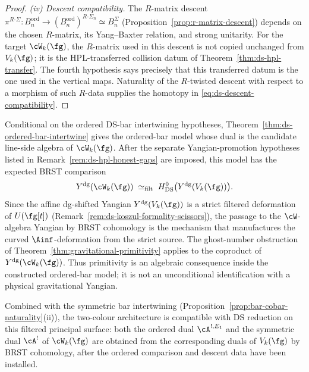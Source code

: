\begin{proof}
\emph{(iv) Descent compatibility.}
The $R$-matrix descent
$\pi^{R\text{-}\Sigma}\colon
B^{\mathrm{ord}}_n \to (B^{\mathrm{ord}}_n)^{R\text{-}\Sigma_n}
\simeq B^\Sigma_n$
(Proposition~\ref{prop:r-matrix-descent}) depends on the
chosen \(R\)-matrix, its Yang--Baxter relation, and strong unitarity.
For the target \(\cW_k(\fg)\), the \(R\)-matrix used in this descent
is not copied unchanged from \(V_k(\fg)\); it is the HPL-transferred
collision datum of Theorem~\ref{thm:ds-hpl-transfer}.  The fourth
hypothesis says precisely that this transferred datum is the one used
in the vertical maps.  Naturality of the \(R\)-twisted descent with
respect to a morphism of such \(R\)-data supplies the homotopy in
\eqref{eq:ds-descent-compatibility}.
\end{proof}

\begin{remark}
\label{rem:ds-ordered-bar-yangian}
%
Conditional on the ordered DS-bar intertwining hypotheses,
Theorem~\ref{thm:ds-ordered-bar-intertwine} gives the ordered-bar
model whose dual is the candidate line-side algebra of
\(\cW_k(\fg)\).  After the separate Yangian-promotion hypotheses
listed in Remark~\ref{rem:ds-hpl-honest-gaps} are imposed, this model
has the expected BRST comparison
\[
Y^{\mathrm{dg}}(\cW_k(\fg))
\;\simeq_{\mathrm{filt}}\;
H^0_{\mathrm{DS}}\bigl(Y^{\mathrm{dg}}(V_k(\fg))\bigr).
\]
Since the affine dg-shifted Yangian $Y^{\mathrm{dg}}(V_k(\fg))$
is a strict filtered deformation of $U(\fg[t])$
(Remark~\ref{rem:ds-koszul-formality-scissors}), the passage
to the $\cW$-algebra Yangian by BRST cohomology is the
mechanism that manufactures the curved $\Ainf$-deformation from
the strict source. The ghost-number obstruction of
Theorem~\ref{thm:gravitational-primitivity} applies to the
coproduct of $Y^{\mathrm{dg}}(\cW_k(\fg))$. Thus primitivity is
an algebraic consequence inside the constructed ordered-bar model;
it is not an unconditional identification with a physical
gravitational Yangian.

Combined with the symmetric bar intertwining
(Proposition~\ref{prop:bar-cobar-naturality}(ii)), the
two-colour architecture is compatible with DS reduction on this
filtered principal surface:
both the ordered dual $\cA^{!,E_1}$ and the symmetric dual
$\cA^!$ of $\cW_k(\fg)$ are obtained from the corresponding
duals of $V_k(\fg)$ by BRST cohomology, after the ordered comparison
and descent data have been installed.
\end{remark}

